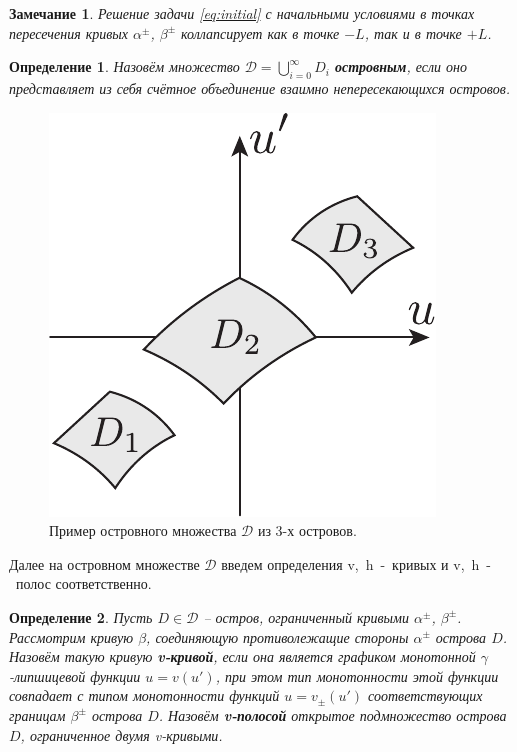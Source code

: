\documentclass{article}
\newtheorem*{definition}{Определение}
\newtheorem{remark}{Замечание}
\begin{document}
\begin{remark}
 	Решение задачи \eqref{eq:initial} с начальными условиями в точках пересечения кривых $\alpha^{\pm}$, $\beta^{\pm}$ коллапсирует как в точке $-L$, так и в точке $+L$.
\label{rem:alpha-beta-intersection}
\end{remark}

\begin{definition}
	Назовём множество $\mathcal{D} = \bigcup_{i = 0}^{\infty} D_i$ {\bf островным}, если оно представляет из себя счётное объединение взаимно непересекающихся островов.
\end{definition}

\begin{figure}[h]
\centering
  \includegraphics[scale = 0.8]{pic/set of islands}
  \caption{Пример островного множества $\mathcal{D}$ из 3-х островов.}
\label{fig:islands}
\end{figure}

Далее на островном множестве $\mathcal{D}$ введем определения v,~h~-~кривых и v,~h~-~полос соответственно.

\begin{definition}
	Пусть $D \in \mathcal{D}$ -- остров, ограниченный кривыми $\alpha^{\pm}$, $\beta^{\pm}$.
	Рассмотрим кривую $\beta$, соединяющую противолежащие стороны $\alpha^{\pm}$ острова $D$.
	Назовём такую кривую {\bf v-кривой}, если она является графиком монотонной $\gamma$-липшицевой функции $u = v(u')$, при этом тип монотонности этой функции совпадает с типом монотонности функций $u = v_{\pm}(u')$ соответствующих границам $\beta^{\pm}$ острова $D$.
	Назовём {\bf v-полосой} открытое подмножество острова $D$, ограниченное двумя \emph{v}-кривыми.
\end{definition}
\end{document}
